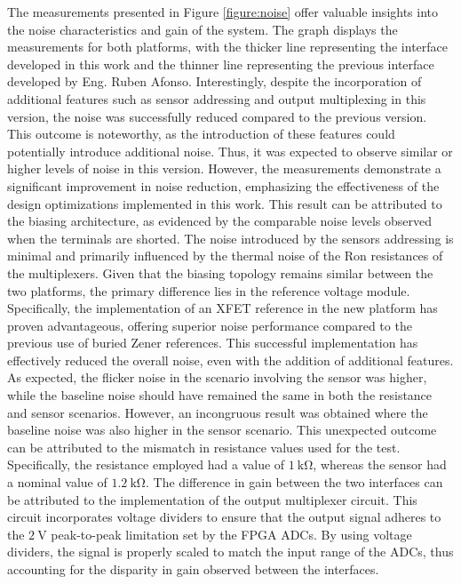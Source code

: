 The measurements presented in Figure \ref{figure:noise} offer valuable insights into the noise characteristics and gain of the system. The graph displays the measurements for both platforms, with the thicker line representing the interface developed in this work and the thinner line representing the previous interface developed by Eng. Ruben Afonso. Interestingly, despite the incorporation of additional features such as sensor addressing and output multiplexing in this version, the noise was successfully reduced compared to the previous version. This outcome is noteworthy, as the introduction of these features could potentially introduce additional noise. Thus, it was expected to observe similar or higher levels of noise in this version. However, the measurements demonstrate a significant improvement in noise reduction, emphasizing the effectiveness of the design optimizations implemented in this work. This result can be attributed to the biasing architecture, as evidenced by the comparable noise levels observed when the terminals are shorted. The noise introduced by the sensors addressing is minimal and primarily influenced by the thermal noise of the Ron resistances of the multiplexers. Given that the biasing topology remains similar between the two platforms, the primary difference lies in the reference voltage module. Specifically, the implementation of an XFET reference in the new platform has proven advantageous, offering superior noise performance compared to the previous use of buried Zener references. This successful implementation has effectively reduced the overall noise, even with the addition of additional features. As expected, the flicker noise in the scenario involving the sensor was higher, while the baseline noise should have remained the same in both the resistance and sensor scenarios. However, an incongruous result was obtained where the baseline noise was also higher in the sensor scenario. This unexpected outcome can be attributed to the mismatch in resistance values used for the test. Specifically, the resistance employed had a value of $\mathrm{1~k\Omega}$, whereas the sensor had a nominal value of $\mathrm{1.2~k\Omega}$. The difference in gain between the two interfaces can be attributed to the implementation of the output multiplexer circuit. This circuit incorporates voltage dividers to ensure that the output signal adheres to the $\mathrm{2~V}$ peak-to-peak limitation set by the \ac{FPGA} \ac{ADC}s. By using voltage dividers, the signal is properly scaled to match the input range of the \ac{ADC}s, thus accounting for the disparity in gain observed between the interfaces.

